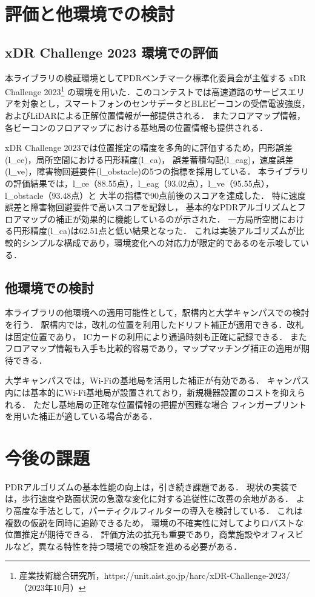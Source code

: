 \documentclass[a4paper, 10pt, twocolumn]{jarticle}
\begin{document}
\section{評価と他環境での検討}

\subsection{xDR Challenge 2023 環境での評価}

本ライブラリの検証環境としてPDRベンチマーク標準化委員会が主催する
xDR Challenge 2023\footnote{産業技術総合研究所，https://unit.aist.go.jp/harc/xDR-Challenge-2023/（2023年10月）}
の環境を用いた．このコンテストでは高速道路のサービスエリアを対象とし，スマートフォンのセンサデータとBLEビーコンの受信電波強度，
およびLiDARによる正解位置情報が一部提供される．
またフロアマップ情報，各ビーコンのフロアマップにおける基地局の位置情報も提供される．

xDR Challenge 2023では位置推定の精度を多角的に評価するため，円形誤差(l\_ce)，局所空間における円形精度(l\_ca)，
誤差蓄積勾配(l\_eag)，速度誤差(l\_ve)，障害物回避要件(l\_obstacle)の5つの指標を採用している．
本ライブラリの評価結果では，l\_ce（88.55点），l\_eag（93.02点），l\_ve（95.55点），l\_obstacle（93.48点）と
大半の指標で90点前後のスコアを達成した．
特に速度誤差と障害物回避要件で高いスコアを記録し，
基本的なPDRアルゴリズムとフロアマップの補正が効果的に機能しているのが示された．
一方局所空間における円形精度(l\_ca)は62.51点と低い結果となった．
これは実装アルゴリズムが比較的シンプルな構成であり，環境変化への対応力が限定的であるのを示唆している．

\subsection{他環境での検討}
本ライブラリの他環境への適用可能性として，駅構内と大学キャンパスでの検討を行う．
駅構内では，改札の位置を利用したドリフト補正が適用できる．改札は固定位置であり，
ICカードの利用により通過時刻も正確に記録できる．
またフロアマップ情報も入手も比較的容易であり，マップマッチング補正の適用が期待できる．

大学キャンパスでは，Wi-Fiの基地局を活用した補正が有効である．
キャンパス内には基本的にWi-Fi基地局が設置されており，新規機器設置のコストを抑えられる．
ただし基地局の正確な位置情報の把握が困難な場合
フィンガープリントを用いた補正が適している場合がある．



\section{今後の課題}
PDRアルゴリズムの基本性能の向上は，引き続き課題である．
現状の実装では，歩行速度や路面状況の急激な変化に対する追従性に改善の余地がある．
より高度な手法として，パーティクルフィルターの導入を検討している．
これは複数の仮説を同時に追跡できるため，
環境の不確実性に対してよりロバストな位置推定が期待できる．
評価方法の拡充も重要であり，商業施設やオフィスビルなど，異なる特性を持つ環境での検証を進める必要がある．




\end{document}
